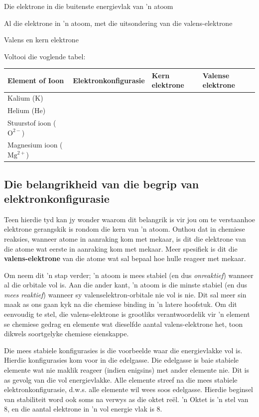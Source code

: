  { Die elektrone in die buitenste energievlak van  'n atoom} 

 {Al die elektrone in  'n atoom, met die uitsondering van die valens-elektrone}
\begin{exercises}{Valens en kern elektrone}
{
Voltooi die voglende tabel:
 \begin{center}
  \begin{tabular}{|l|l|l|l|} \hline
   \textbf{Element of Ioon} & \textbf{Elektronkonfigurasie} & \textbf{Kern elektrone} & \textbf{Valense elektrone} \\ \hline
   Kalium ($\text{K}$) & & & \\ \hline
   Helium ($\text{He}$) & & & \\ \hline
   Stuurstof ioon ($\text{O}^{2-}$) & & & \\ \hline
   Magnesium ioon ($\text{Mg}^{2+}$) & & & \\ \hline
  \end{tabular}
 \end{center}

}
\end{exercises}
      
\label{m38741*uid105}
            \subsection*{Die belangrikheid van die begrip van elektronkonfigurasie}
            \nopagebreak
        \label{m38741*id260011}Teen hierdie tyd kan jy wonder waarom dit belangrik is vir jou om te verstaan ​hoe elektrone gerangskik is rondom die kern van  'n atoom. Onthou dat in chemiese reaksies, wanneer atome in aanraking kom met mekaar, is dit die elektrone van die atome wat eerste in aanraking kom met mekaar. Meer spesifiek is dit die \textbf{valens-elektrone} van die atome wat sal bepaal hoe hulle reageer met
mekaar.\par 
        \label{m38741*id260029}
Om neem dit  'n stap verder; 'n atoom is mees stabiel (en dus \textsl{onreaktief}) wanneer al die orbitale vol is. Aan die ander kant,  'n atoom is die minste stabiel (en dus \textsl{mees reaktief}) wanneer sy valenselektron-orbitale nie vol is nie. Dit sal meer sin maak as ons gaan kyk na die chemiese binding in  'n latere hoofstuk. Om dit eenvoudig te stel, die valens-elektrone is grootliks verantwoordelik vir  'n element se chemiese gedrag en elemente wat dieselfde aantal valens-elektrone het, toon dikwels soortgelyke chemiese eienskappe.\par 
\label{m38741*eip-106}Die mees stabiele konfigurasies is die voorbeelde waar die energievlakke vol is. Hierdie konfigurasies kom voor in die edelgasse. Die edelgasse is baie stabiele elemente wat nie maklik reageer (indien enigsins) met ander elemente nie. Dit is as gevolg van die vol energievlakke. Alle elemente streef na die mees stabiele elektronkonfigurasie, d.w.s. alle elemente wil wees soos edelgasse. Hierdie beginsel van stabiliteit word ook soms na verwys as die oktet reël.  'n Oktet is  'n stel van 8, en die aantal elektrone in  'n vol energie vlak is 8. \par \label{m38741*eip-739}

